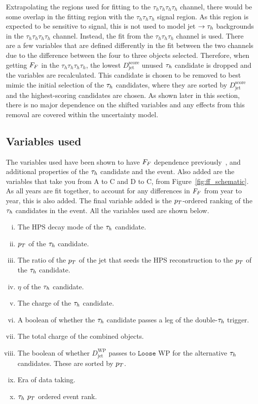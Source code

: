 Extrapolating the regions used for fitting to the $\tau_h \tau_h \tau_h \tau_h$ channel, there would be some overlap in the fitting region with the $\tau_h \tau_h \tau_h$ signal region. 
As this region is expected to be sensitive to signal, this is not used to model jet $\rightarrow\tau_{h}$ backgrounds in the $\tau_h \tau_h \tau_h \tau_h$ channel. 
Instead, the fit from the $\tau_h \tau_h \tau_h$ channel is used. 
There are a few variables that are defined differently in the fit between the two channels due to the difference between the four to three objects selected. 
Therefore, when getting $F_{F}$ in the $\tau_h \tau_h \tau_h \tau_h$, the lowest $D_{\text{jet}}^{\text{score}}$ unused $\tau_{h}$ candidate is dropped and the variables are recalculated. 
This candidate is chosen to be removed to best mimic the initial selection of the $\tau_{h}$ candidates, where they are sorted by $D_{\text{jet}}^{\text{score}}$ and the highest-scoring candidates are chosen. 
As shown later in this section, there is no major dependence on the shifted variables and any effects from this removal are covered within the uncertainty model. \\

\subsection{Variables used}

The variables used have been shown to have $F_{F}$ dependence previously~\cite{CMS:2020rpr,CMS:2022rbd}, and additional properties of the $\tau_{h}$ candidate and the event. 
Also added are the variables that take you from A to C and D to C, from Figure~\ref{fig:ff_schematic}. 
As all years are fit together, to account for any differences in $F_{F}$ from year to year, this is also added. 
The final variable added is the $p_{T}$-ordered ranking of the $\tau_{h}$ candidates in the event.
All the variables used are shown below.

\begin{enumerate}[i)]
\item The \ac{HPS} decay mode of the $\tau_{h}$ candidate.
\item $p_{T}$ of the $\tau_{h}$ candidate.
\item The ratio of the $p_{T}$ of the jet that seeds the \ac{HPS} reconstruction to the $p_{T}$ of the $\tau_{h}$ candidate.
\item $\eta$ of the $\tau_{h}$ candidate.
\item The charge of the $\tau_{h}$ candidate.
\item A boolean of whether the $\tau_{h}$ candidate passes a leg of the double-$\tau_{h}$ trigger.
\item The total charge of the combined objects.
\item The boolean of whether $D_{\text{jet}}^{\text{WP}}$ passes to $\texttt{Loose}$ WP for the alternative $\tau_{h}$ candidates. These are sorted by $p_{T}$.
\item Era of data taking.
\item $\tau_{h}$ $p_{T}$ ordered event rank.
\end{enumerate}

